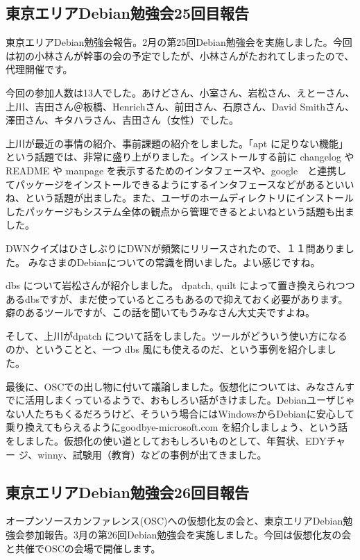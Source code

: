 \documentclass[mingoth,a4paper]{jsarticle}
\begin{document}
\subsection{東京エリアDebian勉強会25回目報告}


東京エリアDebian勉強会報告。2月の第25回Debian勉強会を実施しました。今回
は初の小林さんが幹事の会の予定でしたが、小林さんがたおれてしまったので、
代理開催です。

今回の参加人数は13人でした。あけどさん、小室さん、岩松さん、えとーさん、
上川、吉田さん＠板橋、Henrichさん、前田さん、石原さん、David Smithさん、
澤田さん、キタハラさん、吉田さん（女性）でした。

上川が最近の事情の紹介、事前課題の紹介をしました。「apt に足りない機能」
という話題では、非常に盛り上がりました。インストールする前に changelog 
や README や manpage を表示するためのインタフェースや、google　と連携し
てパッケージをインストールできるようにするインタフェースなどがあるといい
ね、という話題が出ました。また、ユーザのホームディレクトリにインストール
したパッケージもシステム全体の観点から管理できるとよいねという話題も出ま
した。

DWNクイズはひさしぶりにDWNが頻繁にリリースされたので、１１問ありました。
みなさまのDebianについての常識を問いました。よい感じですね。

dbs について岩松さんが紹介しました。
dpatch, quilt によって置き換えられつつあるdbsですが、まだ使っているところもあるので抑えておく必要があります。
癖のあるツールですが、この話を聞いてもうみなさん大丈夫ですよね。

そして、上川がdpatch について話をしました。ツールがどういう使い方になる
のか、ということと、一つ dbs 風にも使えるのだ、という事例を紹介しました。

最後に、OSCでの出し物に付いて議論しました。仮想化については、みなさんす
でに活用しまくっているようで、おもしろい話がきけました。Debianユーザじゃ
ない人たちもくるだろうけど、そういう場合にはWindowsからDebianに安心して
乗り換えてもらえるようにgoodbye-microsoft.com を紹介しましょう、という話
をしました。仮想化の使い道としておもしろいものとして、年賀状、EDYチャー
ジ、winny、試験用（教育）などの事例が出てきました。

\subsection{東京エリアDebian勉強会26回目報告}

オープンソースカンファレンス(OSC)への仮想化友の会と、東京エリアDebian勉
強会参加報告。3月の第26回Debian勉強会を実施しました。今回は仮想化友の会
と共催でOSCの会場で開催します。
\end{document}
